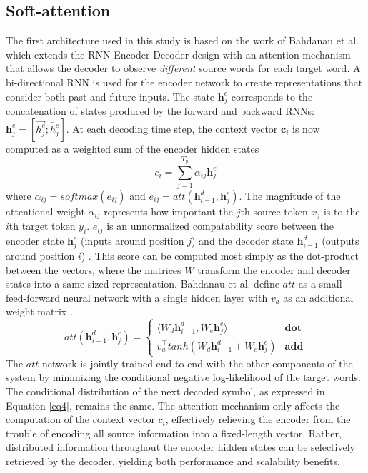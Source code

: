 \documentclass[a4paper]{article}
\begin{document}
\subsection{Soft-attention}

The first architecture used in this study is based on the work of Bahdanau et al. \cite{bahdanau2014neural} which extends the RNN-Encoder-Decoder design with an attention mechanism that allows the decoder to observe \emph{different} source words for each target word. A bi-directional RNN is used for the encoder network to create representations that consider both past and future inputs. The state $\mathbf h^e_j$ corresponds to the concatenation of states produced by the forward and backward RNNs: $\mathbf h^e_j = [\overrightarrow{h^e_j} ; \overleftarrow{h^e_j}]$. At each decoding time step, the context vector $\mathbf c_{i}$ is now computed as a weighted sum of the encoder hidden states
\begin{equation}
 	c_{i} = \sum\limits_{j=1}^{T_y} {\alpha}_{{i}{j}}{\mathbf h^e_j}
  \label{eq6}
\end{equation}
where ${\alpha}_{{i}{j}} = softmax(e_{{i}{j}})$ and $e_{{i}{j}} = att(\mathbf h^d_{i-1}, \mathbf h^e_j)$. The magnitude of the attentional weight ${\alpha}_{{i}{j}}$ represents how important the $j$th source token $x_j$ is to the $i$th target token $y_i$. $e_{{i}{j}}$ is an unnormalized compatability score between the encoder state $\mathbf h^e_j$ (inputs around position $j$) and the decoder state $\mathbf h^d_{i-1}$ (outputs around position $i$) \cite{bahdanau2014neural}\cite{britz2017massive}. This score can be computed most simply as the dot-product between the vectors, where the matrices $W$ transform the encoder and decoder states into a same-sized representation. Bahdanau et al. define $att$ as a small feed-forward neural network with a single hidden layer with $v_a$ as an additional weight matrix \cite{bahdanau2014neural}.
\begin{equation}
 	 att(\mathbf h^d_{i-1}, \mathbf h^e_j) = 
 	\begin{cases}
   	\langle W_d \mathbf h^d_{i-1}, W_e \mathbf h^e_j \rangle  & \mathbf {dot} \\
	v_a^\top tanh(W_d \mathbf h^d_{i-1} + W_e \mathbf h^e_j)  & \mathbf {add}
    \end{cases}	
   \label{eq7}
\end{equation}
The $att$ network is jointly trained end-to-end with the other components of the system by minimizing the conditional negative log-likelihood of the target words. The conditional distribution of the next decoded symbol, as expressed in Equation \ref{eq4}, remains the same. The attention mechanism only affects the computation of the context vector $c_{i}$, effectively relieving the encoder from the trouble of encoding all source information into a fixed-length vector. Rather, distributed information throughout the encoder hidden states can be selectively retrieved by the decoder, yielding both performance and scalability benefits.
\end{document}
